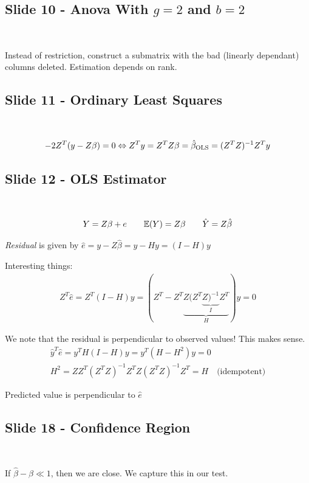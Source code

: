 \subsection{Slide 10 - Anova With $g=2$ and $b=2$}\hfill\\
\par\bigskip
\noindent Instead of restriction, construct a submatrix with the bad (linearly dependant) columns deleted. Estimation depends on rank.
\par\bigskip
\subsection{Slide 11 - Ordinary Least Squares}\hfill\\\par
\begin{equation*}
  \begin{gathered}
    -2Z^T(y-Z\beta) = 0\Leftrightarrow Z^Ty = Z^TZ\beta = \hat{\beta}_{\text{OLS}} = (Z^TZ)^{-1}Z^Ty
  \end{gathered}
\end{equation*}
\par\bigskip
\subsection{Slide 12 - OLS Estimator}\hfill\\\par
\begin{equation*}
  \begin{gathered}
    Y = Z\beta +e \qquad \mathbb{E}(Y) = Z\beta \qquad\hat{Y} = Z\hat{\beta}
  \end{gathered}
\end{equation*}\par
\noindent\textit{Residual} is given by $\hat{e} = y -Z\hat{\beta} = y-Hy = (I-H)y$\par
\noindent Interesting things:
\begin{equation*}
  \begin{gathered}
    Z^T\hat{e} = Z^T(I-H)y = (Z^T-Z^T\underbrace{Z(Z^T\underbrace{Z)^{-1}}_{I}Z^T}_{H})y=0
  \end{gathered}
\end{equation*}
\par\bigskip
\noindent We note that the residual is perpendicular to observed values! This makes sense.
\begin{equation*}
  \begin{gathered}
    \hat{y}^T\hat{e} = y^TH(I-H)y = y^T(H-H^2)y = 0\\
    H^2 = ZZ^T(Z^TZ)^{-1}Z^TZ(Z^TZ)^{-1}Z^T = H \quad\text{(idempotent)}
  \end{gathered}
\end{equation*}
\par\bigskip
\noindent Predicted value is perpendicular to $\hat{e}$
\par\bigskip
\subsection{Slide 18 - Confidence Region}\hfill\\
\par\bigskip
\noindent If $\hat{\beta}-\beta\ll1$, then we are close. We capture this in our test. 
